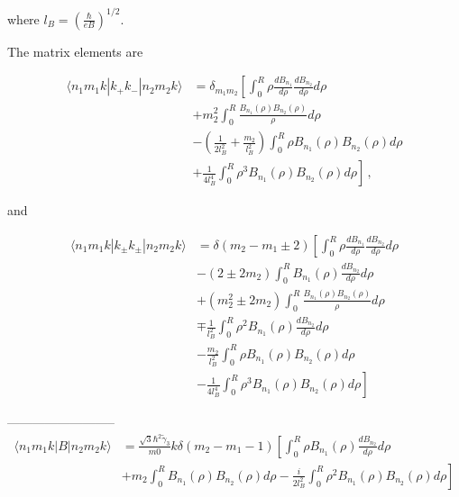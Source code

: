 \documentclass[12pt,a4paper]{article}
\begin{document}
\noindent where $l_B = \left(\frac{\hbar}{e B}\right)^{1/2}$.

The matrix elements are

\begin{equation}
  \begin{split}
    \langle n_1 m_1 k|k_+k_-|n_2 m_2 k\rangle &= \delta_{m_1 m_2} \left[
    \int_0^R \rho \frac{dB_{n_1}}{d\rho}\frac{dB_{n_2}}{d\rho}d\rho \right.\\
    &+ m_2^2 \int_0^R \frac{B_{n_1}(\rho)B_{n_2}(\rho)}{\rho} d\rho \\
    &-\left(\frac{1}{2l_B^2}+\frac{m_2}{l_B^2}\right)\int_0^R \rho B_{n_1}(\rho)B_{n_2}(\rho)d\rho \\
    &\left. + \frac{1}{4l_B^4}\int_0^R \rho^3 B_{n_1}(\rho)B_{n_2}(\rho) d\rho \right]\,,
  \end{split}
\end{equation}

\noindent and

\begin{equation}
  \begin{split}
    \langle n_1 m_1 k|k_{\pm}k_{\pm}|n_2 m_2 k\rangle &= \delta(m_2-m_1\pm 2)
    \left[\int_0^R \rho \frac{dB_{n_1}}{d\rho}\frac{dB_{n_2}}{d\rho}d\rho \right.\\
    &-(2 \pm 2m_2)\int_0^R B_{n_1}(\rho) \frac{dB_{n_2}}{d\rho}d\rho \\
    &+(m_2^2 \pm 2 m_2)\int_0^R \frac{B_{n_1}(\rho)B_{n_2}(\rho)}{\rho} d\rho \\
    &\mp \frac{1}{l_B^2} \int_0^R \rho^2 B_{n_1}(\rho) \frac{dB_{n_2}}{d\rho} d\rho \\
    & - \frac{m_2}{l_B^2} \int_0^R \rho B_{n_1}(\rho) B_{n_2}(\rho) d\rho\\
    &\left. - \frac{1}{4l_B^4}\int_0^R \rho^3 B_{n_1}(\rho) B_{n_2}(\rho) d\rho\right]
  \end{split}
\end{equation}

--------------------------
\begin{equation}
  \begin{split}
    \langle n_1 m_1 k|B|n_2 m_2 k\rangle &= \frac{\sqrt{3}\hbar^2\tilde{\gamma}_3}{m0}
    k \delta(m_2-m_1-1)\left[\int_0^R \rho B_{n_1}(\rho) \frac{dB_{n_2}}{d\rho} d\rho \right.\\
    & \left.+ m_2 \int_0^R B_{n_1}(\rho) B_{n_2}(\rho) d\rho
    - \frac{i}{2 l_B^2}\int_0^R \rho^2 B_{n_1}(\rho) B_{n_2}(\rho) d\rho \right]
  \end{split}
\end{equation}


{}

\end{document}
